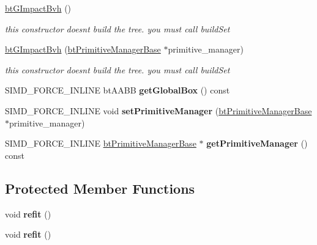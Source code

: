 \begin{DoxyCompactItemize}
\hyperlink{classbtGImpactBvh_ab305fcdbd3faf585e253433b7193587e}{bt\+G\+Impact\+Bvh} ()
\begin{DoxyCompactList}\small\item\em this constructor doesn\textquotesingle{}t build the tree. you must call build\+Set \end{DoxyCompactList}\item 
\mbox{\label{classbtGImpactBvh_afbb8405cc5348fc66dc09819bfc60969}} 
\hyperlink{classbtGImpactBvh_afbb8405cc5348fc66dc09819bfc60969}{bt\+G\+Impact\+Bvh} (\hyperlink{classbtPrimitiveManagerBase}{bt\+Primitive\+Manager\+Base} $\ast$primitive\+\_\+manager)
\begin{DoxyCompactList}\small\item\em this constructor doesn\textquotesingle{}t build the tree. you must call build\+Set \end{DoxyCompactList}\item 
\mbox{\label{classbtGImpactBvh_afe0fef20aaf1e694662c7d04b8b8b1e8}} 
S\+I\+M\+D\+\_\+\+F\+O\+R\+C\+E\+\_\+\+I\+N\+L\+I\+NE bt\+A\+A\+BB {\bfseries get\+Global\+Box} () const
\item 
\mbox{\label{classbtGImpactBvh_a9bf61ff1769af089dd53e2f1a78c8ef8}} 
S\+I\+M\+D\+\_\+\+F\+O\+R\+C\+E\+\_\+\+I\+N\+L\+I\+NE void {\bfseries set\+Primitive\+Manager} (\hyperlink{classbtPrimitiveManagerBase}{bt\+Primitive\+Manager\+Base} $\ast$primitive\+\_\+manager)
\item 
\mbox{\label{classbtGImpactBvh_a9c34d5bc31bb61f969de2aa6868e015e}} 
S\+I\+M\+D\+\_\+\+F\+O\+R\+C\+E\+\_\+\+I\+N\+L\+I\+NE \hyperlink{classbtPrimitiveManagerBase}{bt\+Primitive\+Manager\+Base} $\ast$ {\bfseries get\+Primitive\+Manager} () const
\end{DoxyCompactItemize}
\subsection*{Protected Member Functions}
\begin{DoxyCompactItemize}
\item 
\mbox{\label{classbtGImpactBvh_afd14c2dcbbc9ceb6e13d0dee860faa48}} 
void {\bfseries refit} ()
\item 
\mbox{\label{classbtGImpactBvh_afd14c2dcbbc9ceb6e13d0dee860faa48}} 
void {\bfseries refit} ()
\end{DoxyCompactItemize}
